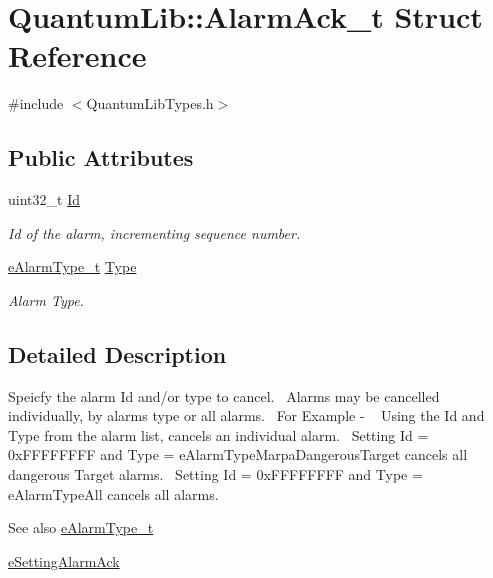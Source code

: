 \hypertarget{struct_quantum_lib_1_1_alarm_ack__t}{}\section{Quantum\+Lib\+:\+:Alarm\+Ack\+\_\+t Struct Reference}
\label{struct_quantum_lib_1_1_alarm_ack__t}


{\ttfamily \#include $<$Quantum\+Lib\+Types.\+h$>$}

\subsection*{Public Attributes}
\begin{DoxyCompactItemize}
\item 
uint32\+\_\+t \mbox{\hyperlink{struct_quantum_lib_1_1_alarm_ack__t_a63727f64772eb3db71b3bd81ce0ea6a1}{Id}}
\begin{DoxyCompactList}\small\item\em Id of the alarm, incrementing sequence number. \end{DoxyCompactList}\item 
\mbox{\hyperlink{namespace_quantum_lib_a63dd10ad28888fcad99c7b8c5f155750}{e\+Alarm\+Type\+\_\+t}} \mbox{\hyperlink{struct_quantum_lib_1_1_alarm_ack__t_a3e330071310ae5fc50e351b9246bbbc6}{Type}}
\begin{DoxyCompactList}\small\item\em Alarm Type. \end{DoxyCompactList}\end{DoxyCompactItemize}


\subsection{Detailed Description}
Speicfy the alarm Id and/or type to cancel.~\newline
Alarms may be cancelled individually, by alarms type or all alarms.~\newline
For Example -\/ ~\newline
Using the Id and Type from the alarm list, cancels an individual alarm.~\newline
Setting Id = 0x\+F\+F\+F\+F\+F\+F\+FF and Type = e\+Alarm\+Type\+Marpa\+Dangerous\+Target cancels all dangerous Target alarms.~\newline
Setting Id = 0x\+F\+F\+F\+F\+F\+F\+FF and Type = e\+Alarm\+Type\+All cancels all alarms.~\newline
\begin{DoxySeeAlso}{See also}
\mbox{\hyperlink{namespace_quantum_lib_a63dd10ad28888fcad99c7b8c5f155750}{e\+Alarm\+Type\+\_\+t}} 

\mbox{\hyperlink{namespace_quantum_lib_acc8124e3e65bca4aa798d03a55e3d54ca66e51b6ee77469163792596584c4711b}{e\+Setting\+Alarm\+Ack}} 
\end{DoxySeeAlso}


